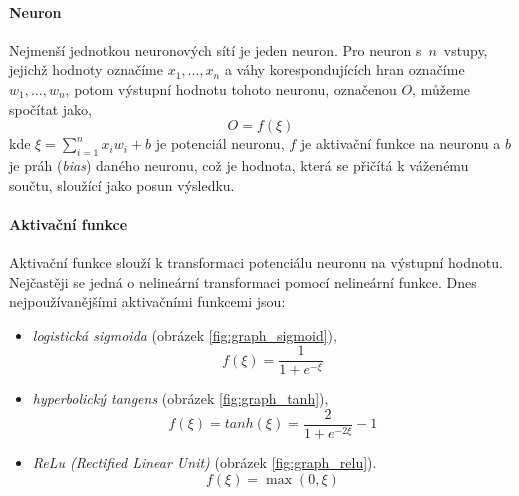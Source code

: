 \paragraph{Neuron}
Nejmenší jednotkou neuronových sítí je jeden neuron. Pro neuron s~$n$~vstupy,
jejichž hodnoty označíme $x_1,...,x_n$ a váhy korespondujících hran označíme\\
$w_1,...,w_n$, potom výstupní hodnotu tohoto neuronu, označenou $O$,
můžeme spočítat jako,
\begin{equation}
    O = f(\xi)
\end{equation}
kde  $\xi = \sum_{i=1}^{n} x_iw_i + b$ je potenciál neuronu, $f$ je aktivační
funkce na neuronu a $b$ je práh (\emph{bias}) daného neuronu, což je hodnota,
která se přičítá k váženému součtu, sloužící jako posun výsledku.

\paragraph{Aktivační funkce}
Aktivační funkce slouží k transformaci potenciálu neuronu na výstupní hodnotu.
Nejčastěji se jedná o nelineární transformaci pomocí nelineární funkce. Dnes
nejpoužívanějšími aktivačními funkcemi jsou:

\begin{itemize}
    \item \emph{logistická sigmoida} (obrázek \ref{fig:graph_sigmoid}),
        \begin{equation}
            f(\xi) = \frac{1}{1+e^{-\xi}}
        \end{equation}
    \item \emph{hyperbolický tangens} (obrázek \ref{fig:graph_tanh}),
        \begin{equation}
            f(\xi) = tanh(\xi) = \frac{2}{1+e^{-2\xi}} - 1
        \end{equation}
    \item \emph{ReLu (Rectified Linear Unit)} (obrázek \ref{fig:graph_relu}).
        \begin{equation}
            f(\xi) = \max(0, \xi)
        \end{equation}
\end{itemize}

